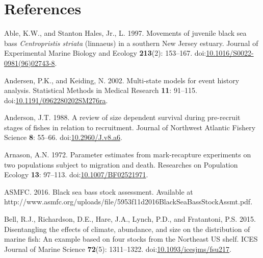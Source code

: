 \documentclass[
]{article}
\newlength{\cslhangindent}
\newlength{\cslentryspacingunit} %
\newenvironment{CSLReferences}[2] %
 {%
  \setlength{\parindent}{0pt}
  \ifodd #1
  \let\oldpar\par
  \def\par{\hangindent=\cslhangindent\oldpar}
  \fi
  \setlength{\parskip}{#2\cslentryspacingunit}
 }%
 {}
\begin{document}
\pagebreak

\hypertarget{references}{%
\section*{References}\label{references}}

\hypertarget{refs}{}
\begin{CSLReferences}{1}{0}
\leavevmode{}%
Able, K.W., and Stanton Hales, Jr., L. 1997. Movements of juvenile black sea bass \emph{{C}entropristis striata} (linnaeus) in a southern {N}ew {J}ersey estuary. Journal of Experimental Marine Biology and Ecology \textbf{213}(2): 153--167. doi:\href{https://doi.org/10.1016/S0022-0981(96)02743-8}{10.1016/S0022-0981(96)02743-8}.

\leavevmode{}%
Andersen, P.K., and Keiding, N. 2002. Multi-state models for event history analysis. Statistical Methods in Medical Research \textbf{11}: 91--115. doi:\href{https://doi.org/10.1191/0962280202SM276ra}{10.1191/0962280202SM276ra}.

\leavevmode{}%
Anderson, J.T. 1988. A review of size dependent survival during pre-recruit stages of fishes in relation to recruitment. Journal of Northwest Atlantic Fishery Science \textbf{8}: 55--66. doi:\href{https://doi.org/10.2960/J.v8.a6}{10.2960/J.v8.a6}.

\leavevmode{}%
Arnason, A.N. 1972. Parameter estimates from mark-recapture experiments on two populations subject to migration and death. Researches on Population Ecology \textbf{13}: 97--113. doi:\href{https://doi.org/10.1007/BF02521971}{10.1007/BF02521971}.

\leavevmode{}%
ASMFC. 2016. Black sea bass stock assessment. {Available} at http://www.asmfc.org/uploads/file/5953f11d2016BlackSeaBassStockAssmt.pdf.

\leavevmode{}%
Bell, R.J., Richardson, D.E., Hare, J.A., Lynch, P.D., and Fratantoni, P.S. 2015. Disentangling the effects of climate, abundance, and size on the distribution of marine fish: An example based on four stocks from the {N}ortheast {US} shelf. ICES Journal of Marine Science \textbf{72}(5): 1311--1322. doi:\href{https://doi.org/10.1093/icesjms/fsu217}{10.1093/icesjms/fsu217}.


\end{CSLReferences}
\end{document}
